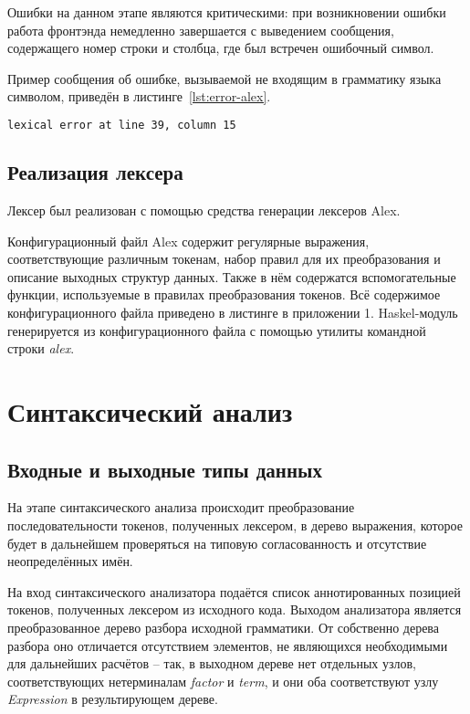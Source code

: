 \documentclass[a4paper,12pt]{report}
\numberwithin{equation}{section}
\begin{document}
Ошибки на данном этапе являются критическими: при возникновении ошибки работа фронтэнда немедленно завершается с выведением сообщения, содержащего номер строки и столбца, где был встречен ошибочный символ.

Пример сообщения об ошибке, вызываемой не входящим в грамматику языка символом, приведён в листинге~\ref{lst:error-alex}.

\begin{lstlisting}[float={},language=bash,caption={Сообщение о лексической ошибке},label=lst:error-alex]
lexical error at line 39, column 15
\end{lstlisting}

\subsection{Реализация лексера}
Лексер был реализован с помощью средства генерации лексеров Alex.

Конфигурационный файл Alex содержит регулярные выражения, соответствующие различным токенам, набор правил для их преобразования и описание выходных структур данных.
Также в нём содержатся вспомогательные функции, используемые в правилах преобразования токенов.
Всё содержимое конфигурационного файла приведено в листинге в приложении 1.
Haskel-модуль генерируется из конфигурационного файла с помощью утилиты командной строки \textit{alex}.

\section{Синтаксический анализ}
\subsection{Входные и выходные типы данных}
На этапе синтаксического анализа происходит преобразование последовательности токенов, полученных лексером, в дерево выражения, которое будет в дальнейшем проверяться на типовую согласованность и отсутствие неопределённых имён.

На вход синтаксического анализатора подаётся список аннотированных позицией токенов, полученных лексером из исходного кода.
Выходом анализатора является преобразованное дерево разбора исходной грамматики.
От собственно дерева разбора оно отличается отсутствием элементов, не являющихся необходимыми для дальнейших расчётов -- так, в выходном дереве нет отдельных узлов, соответствующих нетерминалам \textit{factor} и \textit{term}, и они оба соответствуют узлу \textit{Expression} в результирующем дереве.
\end{document}
